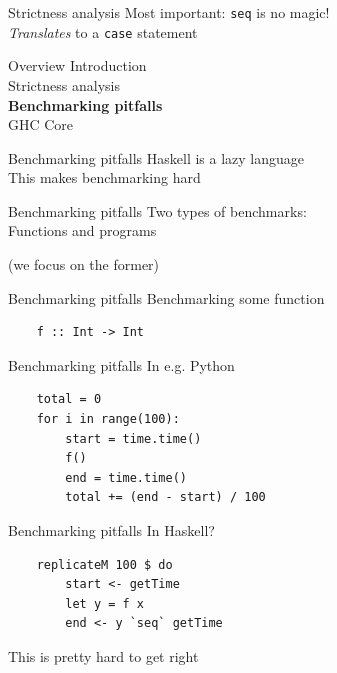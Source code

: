 \documentclass[20pt]{beamer}
\newcommand{\vspaced}{
    \vspace{5mm}
}
\begin{document}
\begin{frame}[fragile]{Strictness analysis}
    Most important: \texttt{seq} is no magic! \\
    \textit{Translates} to a \texttt{case} statement
\end{frame}




\begin{frame}{Overview}
    Introduction \\
    Strictness analysis \\
    \textbf{Benchmarking pitfalls} \\
    GHC Core \\
\end{frame}

\begin{frame}{Benchmarking pitfalls}
    Haskell is a lazy language \\
    This makes benchmarking hard
\end{frame}

\begin{frame}{Benchmarking pitfalls}
    Two types of benchmarks: \\
    Functions and programs \\
    \vspaced
    (we focus on the former)
\end{frame}

\begin{frame}[fragile]{Benchmarking pitfalls}
    Benchmarking some function

    \begin{lstlisting}
    f :: Int -> Int
    \end{lstlisting}
\end{frame}

\begin{frame}[fragile]{Benchmarking pitfalls}
    In e.g. Python
    \vspaced
    \begin{lstlisting}
    total = 0
    for i in range(100):
        start = time.time()
        f()
        end = time.time()
        total += (end - start) / 100
    \end{lstlisting}
\end{frame}

\begin{frame}[fragile]{Benchmarking pitfalls}
    In Haskell?
    \vspaced
    \begin{lstlisting}
    replicateM 100 $ do
        start <- getTime
        let y = f x
        end <- y `seq` getTime
    \end{lstlisting}
    \vspaced
    This is pretty hard to get right
\end{frame}
\end{document}
